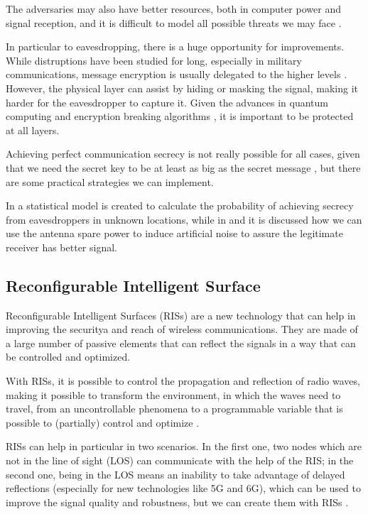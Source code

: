 The adversaries may also have better resources, both in computer power and signal reception, and it is difficult to model all possible threats we may face \cite{7120011}.

In particular to eavesdropping, there is a huge opportunity for improvements. While distruptions have been studied for long, especially in military communications, message encryption is usually delegated to the higher levels \cite{6739367}. However, the physical layer can assist by hiding or masking the signal, making it harder for the eavesdropper to capture it. Given the advances in quantum computing and encryption breaking algorithms \cite{365700}, it is important to be protected at all layers.

Achieving perfect communication secrecy is not really possible for all cases, given that we need the secret key to be at least as big as the secret message \cite{6769090}, but there are some practical strategies we can implement.

In \cite{7543509} a statistical model is created to calculate the probability of achieving secrecy from eavesdroppers in unknown locations, while in \cite{4543070} and \cite{1605889} it is discussed how we can use the antenna spare power to induce artificial noise to assure the legitimate receiver has better signal.

\subsection{Reconfigurable Intelligent Surface}

Reconfigurable Intelligent Surfaces (RISs) are a new technology that can help in improving the securitya and reach of wireless communications. They are made of a large number of passive elements that can reflect the signals in a way that can be controlled and optimized.

With RISs, it is possible to control the propagation and reflection of radio waves, making it possible to transform the environment, in which the waves need to travel, from an uncontrollable phenomena to a programmable variable that is possible to (partially) control and optimize \cite{9086766}.

RISs can help in particular in two scenarios. In the first one, two nodes which are not in the line of sight (LOS) can communicate with the help of the RIS; in the second one, being in the LOS means an inability to take advantage of delayed reflections (especially for new technologies like 5G and 6G), which can be used to improve the signal quality and robustness, but we can create them with RISs \cite{9086766}.

